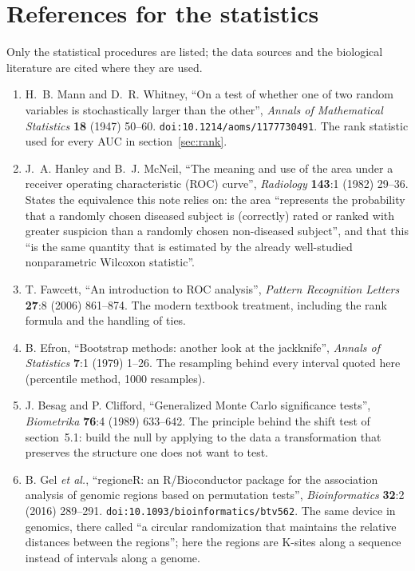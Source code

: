 \documentclass[11pt,a4paper]{article}
\begin{document}
\section{References for the statistics}\label{sec:refs}

Only the statistical procedures are listed; the data sources and the
biological literature are cited where they are used.

\begin{enumerate}
\item[{[1]}] H.~B. Mann and D.~R. Whitney, ``On a test of whether one of two
  random variables is stochastically larger than the other'', \emph{Annals of
  Mathematical Statistics} \textbf{18} (1947) 50--60.
  \texttt{doi:10.1214/aoms/1177730491}. The rank statistic used for every AUC
  in section~\ref{sec:rank}.
\item[{[2]}] J.~A. Hanley and B.~J. McNeil, ``The meaning and use of the area
  under a receiver operating characteristic (ROC) curve'', \emph{Radiology}
  \textbf{143}:1 (1982) 29--36. States the equivalence this note relies on:
  the area ``represents the probability that a randomly chosen diseased
  subject is (correctly) rated or ranked with greater suspicion than a
  randomly chosen non-diseased subject'', and that this ``is the same quantity
  that is estimated by the already well-studied nonparametric Wilcoxon
  statistic''.
\item[{[3]}] T. Fawcett, ``An introduction to ROC analysis'', \emph{Pattern
  Recognition Letters} \textbf{27}:8 (2006) 861--874. The modern textbook
  treatment, including the rank formula and the handling of ties.
\item[{[4]}] B. Efron, ``Bootstrap methods: another look at the jackknife'',
  \emph{Annals of Statistics} \textbf{7}:1 (1979) 1--26. The resampling behind
  every interval quoted here (percentile method, 1000 resamples).
\item[{[5]}] J. Besag and P. Clifford, ``Generalized Monte Carlo significance
  tests'', \emph{Biometrika} \textbf{76}:4 (1989) 633--642. The principle
  behind the shift test of section~5.1: build the null by applying to the data
  a transformation that preserves the structure one does not want to test.
\item[{[6]}] B. Gel \emph{et al.}, ``regioneR: an R/Bioconductor package for
  the association analysis of genomic regions based on permutation tests'',
  \emph{Bioinformatics} \textbf{32}:2 (2016) 289--291.
  \texttt{doi:10.1093/bioinformatics/btv562}. The same device in genomics,
  there called ``a circular randomization that maintains the relative
  distances between the regions''; here the regions are K-sites along a
  sequence instead of intervals along a genome.
\end{enumerate}
\end{document}
